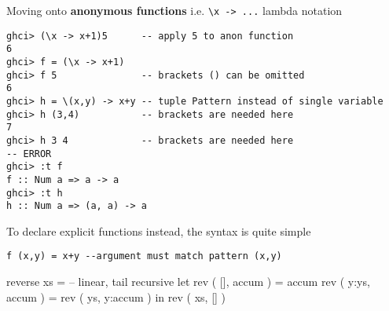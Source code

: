 Moving onto \textbf{anonymous functions} i.e. \lstinline|\x -> ...| lambda notation
\begin{lstlisting}
ghci> (\x -> x+1)5      -- apply 5 to anon function
6
ghci> f = (\x -> x+1)
ghci> f 5               -- brackets () can be omitted
6
ghci> h = \(x,y) -> x+y -- tuple Pattern instead of single variable
ghci> h (3,4)           -- brackets are needed here
7
ghci> h 3 4             -- brackets are needed here
-- ERROR
ghci> :t f
f :: Num a => a -> a
ghci> :t h
h :: Num a => (a, a) -> a
\end{lstlisting}

To declare explicit functions instead, the syntax is quite simple
\begin{lstlisting}
f (x,y) = x+y --argument must match pattern (x,y)
\end{lstlisting}

reverse xs = -- linear, tail recursive
   let rev ( [], accum ) = accum
      rev ( y:ys, accum ) = rev ( ys, y:accum )
   in rev ( xs, [] )